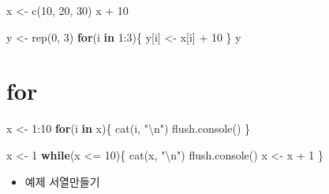 \documentclass[
]{book}
\newenvironment{Shaded}{\begin{snugshade}}{\end{snugshade}}
\newcommand{\ControlFlowTok}[1]{\textcolor[rgb]{0.13,0.29,0.53}{\textbf{#1}}}
\newcommand{\DecValTok}[1]{\textcolor[rgb]{0.00,0.00,0.81}{#1}}
\newcommand{\FunctionTok}[1]{\textcolor[rgb]{0.00,0.00,0.00}{#1}}
\newcommand{\NormalTok}[1]{#1}
\newcommand{\OtherTok}[1]{\textcolor[rgb]{0.56,0.35,0.01}{#1}}
\newcommand{\SpecialCharTok}[1]{\textcolor[rgb]{0.00,0.00,0.00}{#1}}
\newcommand{\StringTok}[1]{\textcolor[rgb]{0.31,0.60,0.02}{#1}}
\providecommand{\tightlist}{%
  \setlength{\itemsep}{0pt}\setlength{\parskip}{0pt}}
\begin{document}
\begin{Shaded}
\begin{Highlighting}[]
\NormalTok{x }\OtherTok{\textless{}{-}} \FunctionTok{c}\NormalTok{(}\DecValTok{10}\NormalTok{, }\DecValTok{20}\NormalTok{, }\DecValTok{30}\NormalTok{)}
\NormalTok{x }\SpecialCharTok{+} \DecValTok{10}

\NormalTok{y }\OtherTok{\textless{}{-}} \FunctionTok{rep}\NormalTok{(}\DecValTok{0}\NormalTok{, }\DecValTok{3}\NormalTok{)}
\ControlFlowTok{for}\NormalTok{(i }\ControlFlowTok{in} \DecValTok{1}\SpecialCharTok{:}\DecValTok{3}\NormalTok{)\{}
\NormalTok{  y[i] }\OtherTok{\textless{}{-}}\NormalTok{ x[i] }\SpecialCharTok{+} \DecValTok{10}
\NormalTok{\}}
\NormalTok{y}
\end{Highlighting}
\end{Shaded}

\hypertarget{for}{%
\section{for}\label{for}}

\begin{Shaded}
\begin{Highlighting}[]
\NormalTok{x }\OtherTok{\textless{}{-}} \DecValTok{1}\SpecialCharTok{:}\DecValTok{10}
\ControlFlowTok{for}\NormalTok{(i }\ControlFlowTok{in}\NormalTok{ x)\{}
  \FunctionTok{cat}\NormalTok{(i, }\StringTok{"}\SpecialCharTok{\textbackslash{}n}\StringTok{"}\NormalTok{)}
  \FunctionTok{flush.console}\NormalTok{()}
\NormalTok{\}}
\end{Highlighting}
\end{Shaded}

\begin{Shaded}
\begin{Highlighting}[]
\NormalTok{x }\OtherTok{\textless{}{-}} \DecValTok{1}
\ControlFlowTok{while}\NormalTok{(x }\SpecialCharTok{\textless{}=} \DecValTok{10}\NormalTok{)\{}
  \FunctionTok{cat}\NormalTok{(x, }\StringTok{"}\SpecialCharTok{\textbackslash{}n}\StringTok{"}\NormalTok{)}
  \FunctionTok{flush.console}\NormalTok{()}
\NormalTok{  x }\OtherTok{\textless{}{-}}\NormalTok{ x }\SpecialCharTok{+} \DecValTok{1}
\NormalTok{\}}
\end{Highlighting}
\end{Shaded}

\begin{itemize}
\tightlist
\item
  예제 서열만들기
\end{itemize}
\end{document}
